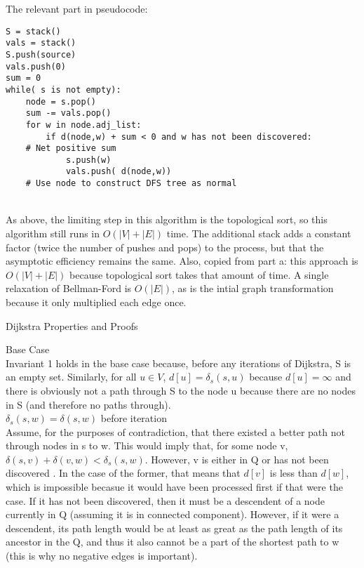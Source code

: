 \documentclass[12pt,twoside]{article}
\begin{document}
\begin{problems}
\begin{problemparts}
The relevant part in pseudocode: \\
\begin{lstlisting}
S = stack()
vals = stack()
S.push(source)
vals.push(0)
sum = 0
while( s is not empty):
    node = s.pop()
    sum -= vals.pop()
    for w in node.adj_list:
        if d(node,w) + sum < 0 and w has not been discovered: 
	# Net positive sum
            s.push(w)
            vals.push( d(node,w))
    # Use node to construct DFS tree as normal
\end{lstlisting}
\\
As above, the limiting step in this algorithm is the topological sort, so this algorithm still runs in $O(|V|+|E|)$ time.  The additional stack adds a constant factor (twice the number of pushes and pops) to the process, but that the asymptotic efficiency remains the same.  Also, copied from part a: this approach is $O(|V|+|E|)$ because topological sort takes that amount of time.  A single relaxation of Bellman-Ford is $O(|E|)$, as is the intial graph transformation because it only multiplied each edge once.
\\
\end{problemparts}
\problem Dijkstra Properties and Proofs
\begin{problemparts}
\problempart Base Case\\
Invariant 1 holds in the base case because, before any iterations of Dijkstra, S is an empty set.  Similarly, for all $u \in V$, $d[u] = \delta_s(s,u)$ because $d[u] = \infty$ and there is obviously not a path through S to the node u because there are no nodes in S (and therefore no paths through).\\
\problempart $\delta_s(s,w) = \delta(s,w)$ before iteration\\
Assume, for the purposes of contradiction, that there existed a better path not through nodes in s to w.  This would imply that, for some node v, $\delta(s,v) + \delta(v,w) < \delta_s(s,w)$.  However, v is either in Q or has not been discovered .  In the case of the former, that  means that $d[v]$ is less than $d[w]$, which is impossible becasue it would have been processed first if that were the case.  If it has not been discovered, then it must be a descendent of a node currently in Q (assuming it is in connected component).  However, if it were a descendent, its path length would be at least as great as the path length of its ancestor in the Q, and thus it also cannot be a part of the shortest path to w (this is why no negative edges is important).\\


\end{problemparts}
\end{problems}
\end{document}
